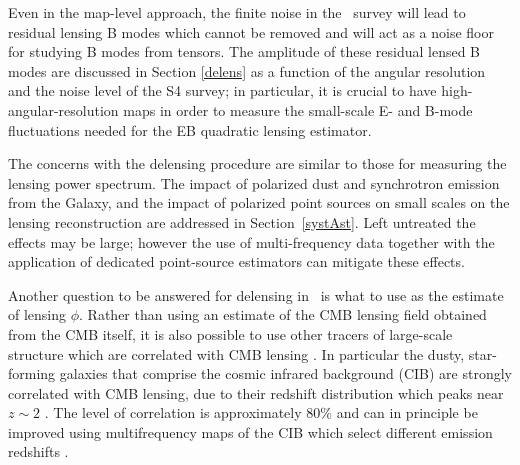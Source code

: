 
Even in the map-level approach, the finite noise in the \cmbexp\ survey will lead to residual lensing B modes which cannot be removed and will act as a noise floor for studying B modes from tensors.  The amplitude of these residual lensed B modes are discussed in Section \ref{delens} as a function of the angular resolution and the noise level of the S4 survey; in particular, it is crucial to have high-angular-resolution maps in order to measure the small-scale E- and B-mode fluctuations needed for the EB quadratic lensing estimator.

The concerns with the delensing procedure are similar to those for measuring the lensing power spectrum. The impact of polarized dust and synchrotron emission from the Galaxy, and the impact of polarized point sources on small scales on the lensing reconstruction are addressed in Section~\ref{systAst}. Left untreated the effects may be large; however the use of  multi-frequency data together with the application of dedicated point-source estimators can mitigate these effects.

Another question to be answered for delensing in \cmbexp\ is what to use as the estimate of lensing $\phi$.
Rather than using an estimate of the CMB lensing field obtained from the CMB itself, it is also possible to use other tracers of large-scale structure which are correlated with  CMB lensing \cite{Smith:2010gu}.  In particular the dusty, star-forming galaxies that comprise the cosmic infrared background (CIB) are strongly correlated with CMB lensing, due to their redshift distribution which peaks near $z \sim 2$ \cite{Sherwin:2015baa,Simard:2014aqa}.  The level of correlation is approximately $80\%$ \cite{Ade:2013lta} and can in principle be improved using multifrequency maps of the CIB which select different emission redshifts \cite{Sherwin:2015baa}.  

